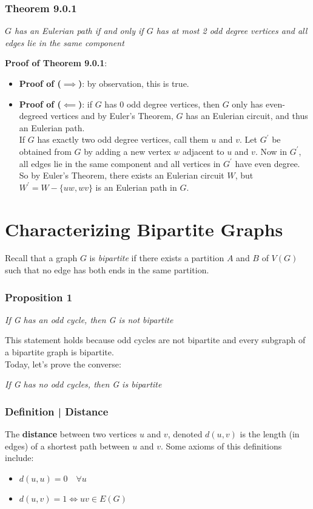 \documentclass{report}
\begin{document}
\subsubsection{Theorem 9.0.1}
\begin{center}
\textit{$G$ has an Eulerian path if and only if $G$ has at most 2 odd degree vertices and all edges lie in the same component} \\
\end{center}
\textbf{Proof of Theorem 9.0.1}:
\begin{itemize}
\item \textbf{Proof of ($\implies$)}: by observation, this is true.
\item \textbf{Proof of ($\impliedby$)}: if $G$ has 0 odd degree vertices, then $G$ only has even-degreed vertices and by Euler's Theorem, $G$ has an Eulerian circuit, and thus an Eulerian path.\\
If $G$ has exactly two odd degree vertices, call them $u$ and $v$. Let $G^\prime$ be obtained from $G$ by adding a new vertex $w$ adjacent to $u$ and $v$. Now in $G^\prime$, all edges lie in the same component and all vertices in $G^\prime$ have even degree. So by Euler's Theorem, there exists an Eulerian circuit $W$, but $W^\prime = W - \{uw, wv\}$ is an Eulerian path in $G$.
\end{itemize}
\section{Characterizing Bipartite Graphs}
Recall that a graph $G$ is \textit{bipartite} if there exists a partition $A$ and $B$ of $V(G)$ such that no edge has both ends in the same partition.\\
\subsubsection{Proposition 1}
\begin{center}
\textit{If G has an odd cycle, then G is not bipartite}
\end{center}
This statement holds because odd cycles are not bipartite and every subgraph of a bipartite graph is bipartite.\\
Today, let's prove the converse:
\begin{center}
\textit{If G has no odd cycles, then G is bipartite}
\end{center}
\subsubsection{Definition | Distance}
The \textbf{distance} between two vertices $u$ and $v$, denoted $d(u,v)$ is the length (in edges) of a shortest path between $u$ and $v$. Some axioms of this definitions include:
\begin{itemize}
\item $d(u,u) = 0 \quad \forall u$
\item $d(u,v) = 1 \iff uv \in E(G)$
\end{itemize}
\end{document}
